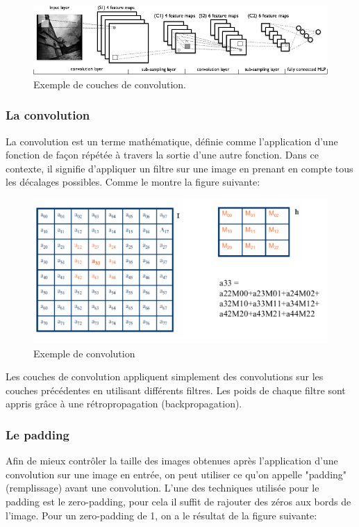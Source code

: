\begin{figure}[H]
	\centering
		\includegraphics[width=5in]{Figures/Mylenet.png}
	\caption[An Electron]{Exemple de couches de convolution.}
	\label{fig:Electron}
\end{figure}


\subsubsection{La convolution}
La convolution est un terme mathématique, définie comme l'application d'une fonction de façon répétée à travers la sortie d'une autre fonction. Dans ce contexte, il signifie d'appliquer un filtre sur une image en prenant en compte tous les décalages possibles. Comme le montre la figure suivante:


\begin{figure}[H]
	\centering
		\includegraphics[width=5in]{Figures/convAouat.png}
	\caption[An Electron]{Exemple de convolution}
	\label{fig:Electron}
\end{figure}



Les couches de convolution appliquent simplement des convolutions sur les couches précédentes en utilisant différents filtres. Les poids de chaque filtre sont appris grâce à une rétropropagation (backpropagation).

\subsubsection{Le padding}
Afin de mieux contrôler la taille des images obtenues après l'application d'une convolution sur une image en entrée, on peut utiliser ce qu'on appelle "padding" (remplissage) avant une convolution.
L'une des techniques utilisée pour le padding est le zero-padding, pour cela il suffit de rajouter des zéros aux bords de l'image. Pour un zero-padding de 1, on a le résultat de la figure suivante:

